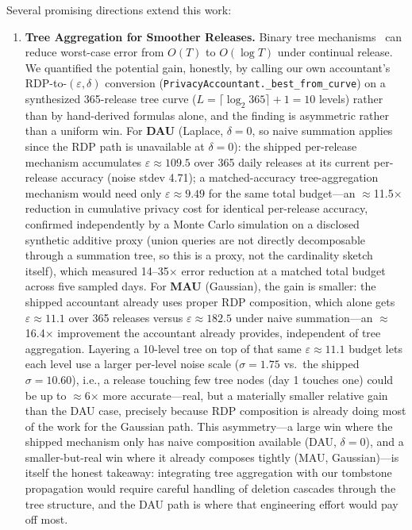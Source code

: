\documentclass[sigconf,anonymous,review]{acmart}
\begin{document}
Several promising directions extend this work:

\begin{enumerate}
    \item \textbf{Tree Aggregation for Smoother Releases.} Binary tree mechanisms~\cite{Chan2011} can reduce worst-case error from $O(T)$ to $O(\log T)$ under continual release. We quantified the potential gain, honestly, by calling our own accountant's RDP-to-$(\varepsilon,\delta)$ conversion (\texttt{PrivacyAccountant.\allowbreak\_best\_from\_curve}) on a synthesized 365-release tree curve ($L = \lceil \log_2 365 \rceil + 1 = 10$ levels) rather than by hand-derived formulas alone, and the finding is asymmetric rather than a uniform win. For \textbf{DAU} (Laplace, $\delta=0$, so naive summation applies since the RDP path is unavailable at $\delta=0$): the shipped per-release mechanism accumulates $\varepsilon \approx 109.5$ over 365 daily releases at its current per-release accuracy (noise stdev 4.71); a matched-accuracy tree-aggregation mechanism would need only $\varepsilon \approx 9.49$ for the same total budget---an $\approx$11.5$\times$ reduction in cumulative privacy cost for identical per-release accuracy, confirmed independently by a Monte Carlo simulation on a disclosed synthetic additive proxy (union queries are not directly decomposable through a summation tree, so this is a proxy, not the cardinality sketch itself), which measured 14--35$\times$ error reduction at a matched total budget across five sampled days. For \textbf{MAU} (Gaussian), the gain is smaller: the shipped accountant already uses proper RDP composition, which alone gets $\varepsilon \approx 11.1$ over 365 releases versus $\varepsilon \approx 182.5$ under naive summation---an $\approx$16.4$\times$ improvement the accountant already provides, independent of tree aggregation. Layering a 10-level tree on top of that same $\varepsilon \approx 11.1$ budget lets each level use a larger per-level noise scale ($\sigma = 1.75$ vs.\ the shipped $\sigma = 10.60$), i.e., a release touching few tree nodes (day 1 touches one) could be up to $\approx$6$\times$ more accurate---real, but a materially smaller relative gain than the DAU case, precisely because RDP composition is already doing most of the work for the Gaussian path. This asymmetry---a large win where the shipped mechanism only has naive composition available (DAU, $\delta=0$), and a smaller-but-real win where it already composes tightly (MAU, Gaussian)---is itself the honest takeaway: integrating tree aggregation with our tombstone propagation would require careful handling of deletion cascades through the tree structure, and the DAU path is where that engineering effort would pay off most.


\end{enumerate}
\end{document}
